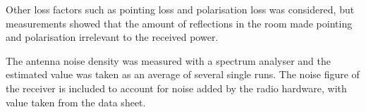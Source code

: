 Other loss factors such as pointing loss and polarisation loss was considered, but measurements showed that the amount of reflections in the room made pointing and polarisation irrelevant to the received power. 
 
The antenna noise density was measured with a spectrum analyser and the estimated value was taken as an average of several single runs. The noise figure of the receiver is included to account for noise added by the radio hardware, with value taken from the data sheet. 

%
%



